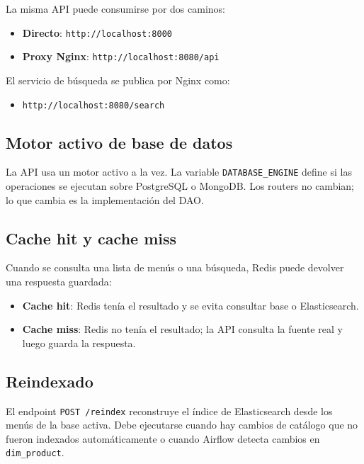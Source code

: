 \documentclass[12pt,letterpaper]{article}
\def\codefile#1{\nolinkurl{#1}}
\begin{document}
La misma API puede consumirse por dos caminos:

\begin{itemize}
    \item \textbf{Directo}: \codefile{http://localhost:8000}
    \item \textbf{Proxy Nginx}: \codefile{http://localhost:8080/api}
\end{itemize}

El servicio de búsqueda se publica por Nginx como:

\begin{itemize}
    \item \codefile{http://localhost:8080/search}
\end{itemize}

\subsection{Motor activo de base de datos}

La API usa un motor activo a la vez. La variable \codefile{DATABASE\_ENGINE} define si las operaciones se ejecutan sobre PostgreSQL o MongoDB. Los routers no cambian; lo que cambia es la implementación del DAO.

\subsection{Cache hit y cache miss}

Cuando se consulta una lista de menús o una búsqueda, Redis puede devolver una respuesta guardada:

\begin{itemize}
    \item \textbf{Cache hit}: Redis tenía el resultado y se evita consultar base o Elasticsearch.
    \item \textbf{Cache miss}: Redis no tenía el resultado; la API consulta la fuente real y luego guarda la respuesta.
\end{itemize}

\subsection{Reindexado}

El endpoint \codefile{POST /reindex} reconstruye el índice de Elasticsearch desde los menús de la base activa. Debe ejecutarse cuando hay cambios de catálogo que no fueron indexados automáticamente o cuando Airflow detecta cambios en \codefile{dim\_product}.
\end{document}
